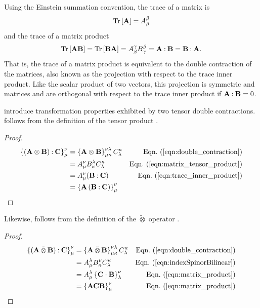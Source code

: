 Using the Einstein summation convention, the trace of a matrix  is
\begin{equation}
	{\rm Tr} \left[ {{\bf A}} \right]  = A^\beta_\beta
	\label{eqn:trace}
\end{equation}
and the trace of a matrix product
\begin{equation}
{\rm Tr} \left[ { {\bf A} {\bf B} } \right]  = {\rm Tr} \left[ { {\bf B} {\bf A} } \right]  = A_\beta^\gamma B_\gamma^\beta = {\bf A} \mathbin{:} {\bf B} = {\bf B} \mathbin{:} {\bf A}.
\label{eqn:trace_inner_product}
\end{equation}
%
That is, the trace of a matrix product is equivalent to the double contraction of the matrices, also known as the projection with respect to the trace inner product.
%
Like the scalar product of two vectors, this projection is symmetric
and matrices  and  are orthogonal with respect to the trace inner product if ${\bf A} \mathbin{:} {\bf B} = 0$. 
%

 introduce transformation properties exhibited by
two tensor double contractions.  
follows from the definition of the tensor product .

\begin{proof}
\label{proof:outerBilinear}
\begin{align*}
\left\{ \left( \outerBilinear{\bf A}{\bf B} \right) \dcbo \JM{C} \right\}_\irow^\icol 
& = \left\{ \outerBilinear{\bf A}{\bf B} \right\}_{\irow\jrow}^{\icol\jcol} C_\jcol^\jrow
& \peqn{double_contraction} \\
& = A_\irow^\icol B_\jrow^\jcol C_\jcol^\jrow & \peqn{matrix_tensor_product} \\
& = A_\irow^\icol (\JM{B} \dcbo \JM{C}) & \peqn{trace_inner_product} \\
& = \left\{ {\bf A}\left(\dc{\bf B}{\bf C}\right) \right\}_\irow^\icol 
\end{align*}
\end{proof}



%
Likewise, 
follows from the definition of the $\tilde\otimes$ operator .
\begin{proof}
\label{proof:spinorBilinear}
\begin{align*}
\left\{ \left( \spinorBilinear{\bf A}{\bf B} \right) \dcbo \JM{C} \right\}_\irow^\icol 
& = \left\{ \spinorBilinear{\bf A}{\bf B} \right\}_{\irow\jrow}^{\icol\jcol} C_\jcol^\jrow
& \peqn{double_contraction} \\
& = A_\irow^\jcol B_\jrow^\icol C_\jcol^\jrow & \peqn{indexSpinorBilinear} \\
& = A_\irow^\jcol \left\{ \JM{C} \cdot \JM{B} \right\}_\jcol^\icol  & \peqn{matrix_product} \\
& = \left\{ {\bf A} \JM{C} \JM{B} \right\}_\irow^\icol & \peqn{matrix_product}
\end{align*}
\end{proof}
